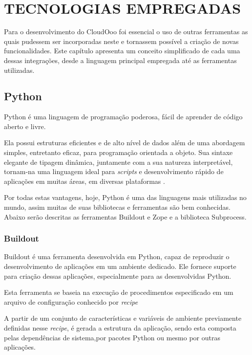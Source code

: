 \chapter{TECNOLOGIAS EMPREGADAS}
\thispagestyle{empty}

Para o desenvolvimento do CloudOoo foi essencial o uso de outras ferramentas as quais pudessem ser incorporadas neste e tornassem possível a criação de novas funcionalidades.
Este capítulo apresenta um conceito simplificado de cada uma dessas integrações, desde a linguagem principal empregada até as ferramentas utilizadas.


\section{Python}

Python é uma linguagem de programação poderosa, fácil de aprender de código aberto e livre. 

Ela possui estruturas eficientes e de alto nível de dados além de uma abordagem simples, entretanto eficaz, para programação orientada a objeto. Sua sintaxe elegante de tipagem dinâmica, juntamente com a sua natureza interpretável, tornam-na uma linguagem ideal para \textit{scripts} e desenvolvimento rápido de aplicações em muitas áreas, em diversas plataformas \cite{GUIDO}.

Por todas estas vantagens, hoje, Python é uma das linguagens mais utilizadas no mundo, assim muitas de suas bibliotecas e ferramentas são bem conhecidas. Abaixo serão descritas as ferramentas Buildout e Zope e a biblioteca Subprocess.


\subsection{Buildout}
\label{Buildout}

Buildout é uma ferramenta desenvolvida em Python, capaz de reproduzir o desenvolvimento de aplicações em um ambiente dedicado. Ele fornece suporte para criação dessas aplicações, especialmente para as desenvolvidas Python. 

Esta ferramenta se baseia na execução de procedimentos especificado em um arquivo de configuração conhecido por \textit{recipe}

A partir de um conjunto de características e variáveis de ambiente previamente definidas nesse \textit{recipe}, é gerada a estrutura da aplicação, sendo esta composta pelas dependências de sistema,por pacotes Python ou mesmo por outras aplicações.


